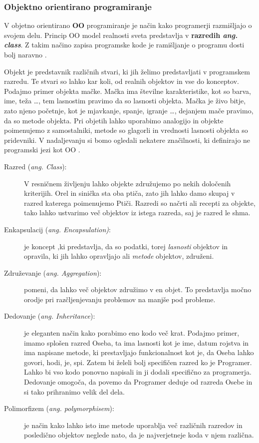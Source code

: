\subsubsection{Objektno orientirano programiranje}
\label{sec:objektno_orijentirano_programiranje}


V objetno orientirano \textbf{OO} programiranje je način kako
programerji razmišljajo o svojem delu. Princip OO model realnosti
sveta predstavlja v \textbf{razredih \emph{ang. class}}. Z takim
načino zapisa programske kode je ramišljanje o programu dosti bolj
naravno \cite{shaums}.

Objekt je predstavnik različnih stvari, ki jih želimo predstavljati v
programskem razredu. Te stvari so lahko kar koli, od realnih objektov
in vse do konceptov. Podajmo primer objekta mačke. Mačka ima številne
karakteristike, kot so barva, ime, teža \dots, tem lasnostim pravimo
da so lasnosti objekta. Mačka je živo bitje, zato njeno početnje, kot
je mjavkanje, spanje, igranje \dots, dejanjem mače pravimo, da so
metode objekta. Pri objetih lahko uporabimo analogijo in objekte
poimenujemo z samostalniki, metode so glagorli in vrednosti lasnosti
objekta so pridevniki. V nadaljevanju si bomo ogledali nekatere
značilnosti, ki definirajo ne programski jezi kot OO \cite{OO-JS}.

\begin{description}
\item[Razred (\emph{ang. Class}):] V resničnem življenju lahko objekte
  združujemo po nekih določenih kriterijih. Orel in sinička sta oba
  ptiča, zato jih lahko damo skupaj v razred katerega poimenujemo
  Ptiči. Razredi so načrti ali recepti za objekte, tako lahko
  ustvarimo več objektov iz istega razreda, saj je razred le shma.
\item [Enkapsulacij (\emph{ang. Encapsulation)}:] je koncept ,ki
  predstavlja, da so podatki, torej \emph{lasnosti} objektov in
  opravila, ki jih lahko opravljajo ali \emph{metode} objektov,
  združeni.
\item [Združevanje (\emph{ang. Aggregation}):] pomeni, da lahko več
  objektov združimo v en objet. To predstavlja močno orodje pri
  razčljenjevanju problemov na manjše pod probleme.
\item [Dedovanje (\emph{ang. Inheritance}):] je eleganten način kako
  porabimo eno kodo več krat. Podajmo primer, imamo splošen razred
  Oseba, ta ima lasnosti kot je ime, datum rojstva in ima napisane
  metode, ki prestavljajo funkcionalnost kot je, da Oseba lahko
  govori, hodi, je, spi. Zatem bi želeli bolj specifičen razred ko je
  Programer. Lahko bi vso kodo ponovno napisali in ji dodali
  specifično za programerja. Dedovanje omogoča, da povemo da Programer
  deduje od razreda Osebe in si tako prihranimo velik del dela.
\item [Polimorfizem (\emph{ang. polymorphisem}):] je način kako lahko
  isto ime metode uporablja več različnih razredov in posledično
  objektov neglede nato, da je najverjetneje koda v njem
  različna.
\end{description}

